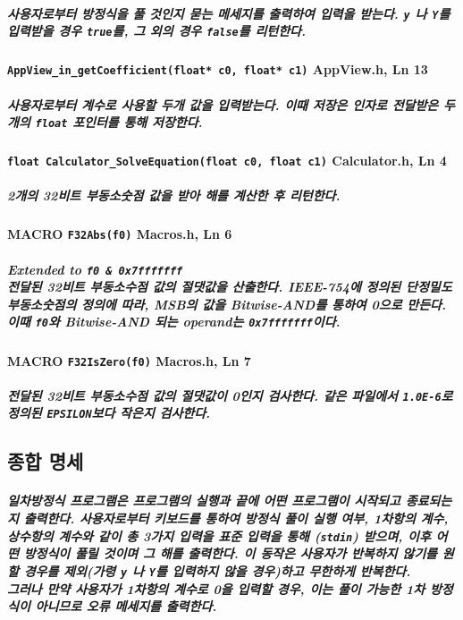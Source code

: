 \documentclass{article}
\begin{document}
    \subparagraph{\normalfont 사용자로부터 방정식을 풀 것인지 묻는 메세지를 출력하여 입력을 받는다. \texttt{y} 나 \texttt{Y}를 입력받을 경우 \texttt{true}를, 그 외의 경우 \texttt{false}를 리턴한다.}

    \paragraph{\large\texttt{AppView\_in\_getCoefficient(float* c0, float* c1)} \tiny AppView.h, Ln 13}

    \subparagraph{\normalfont 사용자로부터 계수로 사용할 두개 값을 입력받는다. 이때 저장은 인자로 전달받은 두개의 \texttt{float} 포인터를 통해 저장한다.}

    \paragraph{\large\texttt{float Calculator\_SolveEquation(float c0, float c1)} \tiny Calculator.h, Ln 4}

    \subparagraph{\normalfont 2개의 32비트 부동소숫점 값을 받아 해를 계산한 후 리턴한다.}

    \paragraph{MACRO \large\texttt{F32Abs(f0)} \tiny Macros.h, Ln 6}

    \subparagraph{Extended to\: \texttt{f0 \& 0x7fffffff}\\
                   전달된 32비트 부동소수점 값의 절댓값을 산출한다. IEEE-754에 정의된 단정밀도 부동소숫점의 정의에 따라, MSB의 값을 Bitwise-AND를 통하여 0으로 만든다. 이때 \texttt{f0}와 Bitwise-AND 되는 operand는 \texttt{0x7fffffff}이다.}

    \paragraph{MACRO \large\texttt{F32IsZero(f0)} \tiny Macros.h, Ln 7}

    \subparagraph{ 전달된 32비트 부동소수점 값의 절댓값이 0인지 검사한다. 같은 파일에서 \texttt{1.0E-6}로 정의된 \texttt{EPSILON}보다 작은지 검사한다.}

    \subsection{종합 명세}

    \subparagraph{ 일차방정식 프로그램은 프로그램의 실행과 끝에 어떤 프로그램이 시작되고 종료되는지 출력한다. 
    사용자로부터 키보드를 통하여 방정식 풀이 실행 여부, 1차항의 계수, 상수항의 계수와 같이 총 3가지 입력을 표준 입력을 통해 (\texttt{stdin}) 받으며, 이후 어떤 방정식이 풀릴 것이며 그 해를 출력한다. 이 동작은 사용자가 반복하지 않기를 원할 경우를 제외(가령 \texttt{y} 나 \texttt{Y}를 입력하지 않을 경우)하고 무한하게 반복한다.\\
    그러나 만약 사용자가 1차항의 계수로 0을 입력할 경우, 이는 풀이 가능한 1차 방정식이 아니므로 오류 메세지를 출력한다.}
\end{document}
